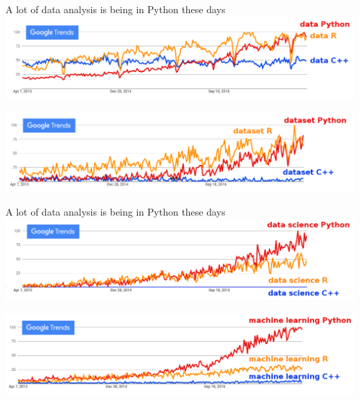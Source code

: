 \documentclass[aspectratio=169]{beamer}
\begin{document}

\begin{frame}{A lot of data analysis is being in Python these days}
\vspace{0.5 cm}
\includegraphics[width=\linewidth]{python-r-cpp-googletrends-data.png}

\vspace{1 cm}
\includegraphics[width=\linewidth]{python-r-cpp-googletrends-dataset.png}
\end{frame}

\begin{frame}{A lot of data analysis is being in Python these days}
\vspace{0.5 cm}
\includegraphics[width=\linewidth]{python-r-cpp-googletrends-datascience.png}

\vspace{1 cm}
\includegraphics[width=\linewidth]{python-r-cpp-googletrends-machinelearning.png}
\end{frame}
\end{document}
